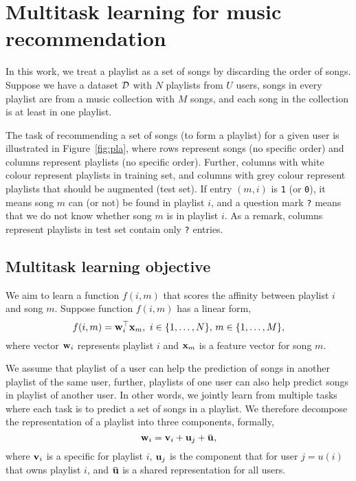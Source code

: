 \section{Multitask learning for music recommendation}

In this work, we treat a playlist as a set of songs by discarding the order of songs.
Suppose we have a dataset $\mathcal{D}$ with $N$ playlists from $U$ users, songs in every playlist are from a music collection 
with $M$ songs, and each song in the collection is at least in one playlist.

The task of recommending a set of songs (to form a playlist) for a given user is illustrated in Figure~\ref{fig:pla},
where rows represent songs (no specific order) and columns represent playlists (no specific order).
Further, columns with white colour represent playlists in training set, 
and columns with grey colour represent playlists that should be augmented (\ie test set).
If entry $(m, i)$ is \texttt{1} (or \texttt{0}), 
it means song $m$ can (or not) be found in playlist $i$,
and a question mark \texttt{?} means that we do not know whether song $m$ is in playlist $i$.
As a remark, columns represent playlists in test set contain only \texttt{?} entries.





\subsection{Multitask learning objective}

%
We aim to learn a function $f(i, m)$ that scores the affinity between playlist $i$ and song $m$.
Suppose function $f(i, m)$ has a linear form, \ie
$$
f(i, m) = \mathbf{w}_i^\top \mathbf{x}_m, \ i \in \{1,\dots,N\}, \, m \in \{1,\dots,M\},
$$
where vector $\mathbf{w}_i$ represents playlist $i$ and $\mathbf{x}_m$ is a feature vector for song $m$.

We assume that playlist of a user can help the prediction of songs in another playlist of the same user,
further, playlists of one user can also help predict songs in playlist of another user.
In other words, we jointly learn from multiple tasks where each task is to predict a set of songs in a playlist.
We therefore decompose the representation of a playlist into three components, formally,
$$
\w_i = \bv_i + \bu_j + \widebar\bu,
$$
where $\mathbf{v}_i$ is a specific for playlist $i$, $\mathbf{u}_j$ is the component that for user $j=u(i)$ that owns playlist $i$,
and $\widebar\bu$ is a shared representation for all users.


